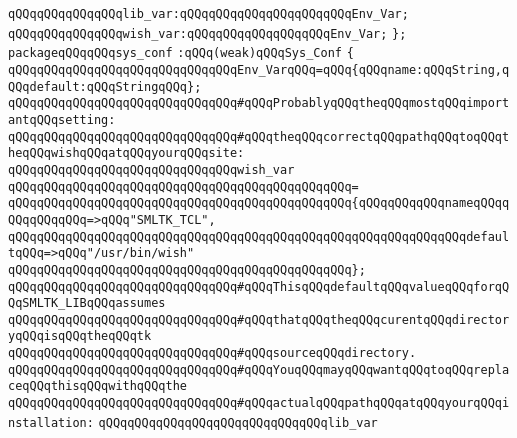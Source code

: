 \verb|qQQqqQQqqQQqqQQqlib_var:qQQqqQQqqQQqqQQqqQQqqQQqEnv_Var;|\newline
\verb|qQQqqQQqqQQqqQQqwish_var:qQQqqQQqqQQqqQQqqQQqEnv_Var;|\newline
\verb|};|\newline
\newline
\newline
\verb|packageqQQqqQQqsys_conf|\newline
\verb|:qQQq(weak)qQQqSys_Conf|\newline
\verb|{|\newline
\verb|qQQqqQQqqQQqqQQqqQQqqQQqqQQqqQQqEnv_VarqQQq=qQQq{qQQqname:qQQqString,qQQqdefault:qQQqStringqQQq};|\newline
\newline
\verb|qQQqqQQqqQQqqQQqqQQqqQQqqQQqqQQq#qQQqProbablyqQQqtheqQQqmostqQQqimportantqQQqsetting:|\newline
\verb|qQQqqQQqqQQqqQQqqQQqqQQqqQQqqQQq#qQQqtheqQQqcorrectqQQqpathqQQqtoqQQqtheqQQqwishqQQqatqQQqyourqQQqsite:|\newline
\newline
\verb|qQQqqQQqqQQqqQQqqQQqqQQqqQQqqQQqwish_var|\newline
\verb|qQQqqQQqqQQqqQQqqQQqqQQqqQQqqQQqqQQqqQQqqQQqqQQq=|\newline
\verb|qQQqqQQqqQQqqQQqqQQqqQQqqQQqqQQqqQQqqQQqqQQqqQQq{qQQqqQQqqQQqnameqQQqqQQqqQQqqQQq=>qQQq"SMLTK_TCL",|\newline
\verb|qQQqqQQqqQQqqQQqqQQqqQQqqQQqqQQqqQQqqQQqqQQqqQQqqQQqqQQqqQQqqQQqdefaultqQQq=>qQQq"/usr/bin/wish"|\newline
\verb|qQQqqQQqqQQqqQQqqQQqqQQqqQQqqQQqqQQqqQQqqQQqqQQq};|\newline
\newline
\verb|qQQqqQQqqQQqqQQqqQQqqQQqqQQqqQQq#qQQqThisqQQqdefaultqQQqvalueqQQqforqQQqSMLTK_LIBqQQqassumes|\newline
\verb|qQQqqQQqqQQqqQQqqQQqqQQqqQQqqQQq#qQQqthatqQQqtheqQQqcurentqQQqdirectoryqQQqisqQQqtheqQQqtk|\newline
\verb|qQQqqQQqqQQqqQQqqQQqqQQqqQQqqQQq#qQQqsourceqQQqdirectory.|\newline
\verb|qQQqqQQqqQQqqQQqqQQqqQQqqQQqqQQq#qQQqYouqQQqmayqQQqwantqQQqtoqQQqreplaceqQQqthisqQQqwithqQQqthe|\newline
\verb|qQQqqQQqqQQqqQQqqQQqqQQqqQQqqQQq#qQQqactualqQQqpathqQQqatqQQqyourqQQqinstallation:|\newline
\newline
\verb|qQQqqQQqqQQqqQQqqQQqqQQqqQQqqQQqlib_var|\newline
